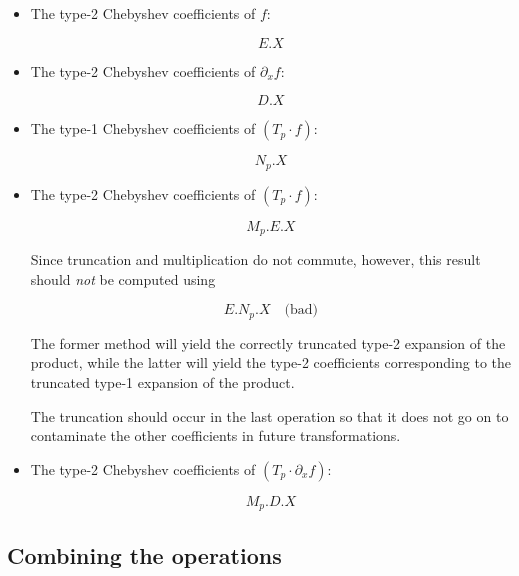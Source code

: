 \documentclass{article}
\begin{document}
\begin{itemize}
    \item The type-2 Chebyshev coefficients of $f$:
    
    \begin{equation*}
    E.X
    \end{equation*}
    
    \item The type-2 Chebyshev coefficients of $\partial_x f$:
    
    \begin{equation*}
    D.X
    \end{equation*}
    
    \item The type-1 Chebyshev coefficients of $(T_p \cdot f)$:
    
    \begin{equation*}
    N_p.X
    \end{equation*}
    
    \item The type-2 Chebyshev coefficients of $(T_p \cdot f)$:

    \begin{equation*}
    M_p.E.X
    \end{equation*}

    Since truncation and multiplication do not commute, however, this result should \emph{not} be computed using
     
    \begin{equation*}
    E.N_p.X \quad \textrm{(bad)}
    \end{equation*}

    The former method will yield the correctly truncated type-2 expansion of the product, while the latter will yield the type-2 coefficients corresponding to the truncated type-1 expansion of the product.  
    
    The truncation should occur in the last operation so that it does not go on to contaminate the other coefficients in future transformations. 
    
    \item The type-2 Chebyshev coefficients of $(T_p \cdot \partial_x f)$:
    
    \begin{equation*}
    M_p.D.X
    \end{equation*}
\end{itemize}

\subsection{Combining the operations}
\end{document}
